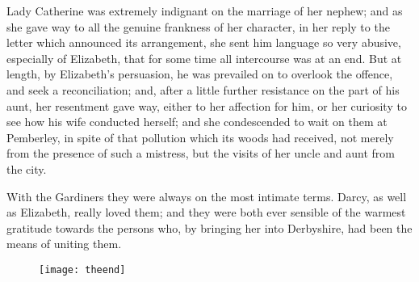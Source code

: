 Lady Catherine was extremely indignant on the marriage of her nephew; and as she gave way to all the genuine frankness of her character, in her reply to the letter which announced its arrangement, she sent him language so very abusive, especially of Elizabeth, that for some time all intercourse was at an end. But at length, by Elizabeth's persuasion, he was prevailed on to overlook the offence, and seek a reconciliation; and, after a little further resistance on the part of his aunt, her resentment gave way, either to her affection for him, or her curiosity to see how his wife conducted herself; and she condescended to wait on them at Pemberley, in spite of that pollution which its woods had received, not merely from the presence of such a mistress, but the visits of her uncle and aunt from the city.

With the Gardiners they were always on the most intimate terms. Darcy, as well as Elizabeth, really loved them; and they were both ever sensible of the warmest gratitude towards the persons who, by bringing her into Derbyshire, had been the means of uniting them.

\begin{figure}[bp!]
\centering
\texttt{[image: theend]}
\end{figure}
